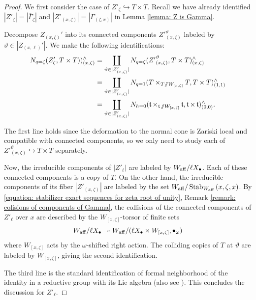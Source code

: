 \begin{proof}
We first consider the case of $Z'_{\zeta} \hookrightarrow T \times T$. Recall we have already identified $|Z'_{\zeta}|=|\overline{\Gamma}_{\zeta}|$ and $|Z'_{(x, \zeta)}| = |\Gamma_{(\zeta, x)}| $  in Lemma \ref{lemma: Z is Gamma}.

Decompose $Z_{(x,\zeta)}'$ into its connected components ${Z'}_{(x, \zeta)}^{\vartheta}$ labeled by $\vartheta \in |Z_{(x, \ell)}'|$. We make the following identifications:
\begin{align*}
  N_{q=\zeta}(Z'_{\zeta}, T \times T))^{\wedge}_{(x, \zeta)}
  &= \coprod_{\vartheta \in |Z'_{(x, \zeta)}|} N_{q=\zeta}({Z'}_{(x, \zeta)}^{\vartheta}, T \times T)^{\wedge}_{(x, \zeta)} \\
  &= \coprod_{\vartheta \in |Z'_{(x, \zeta)}|} N_{q=1}(T \times_{T \sslash W_{[x, \zeta]}} T, T \times T)^{\wedge}_{(1, 1)} \\
  &= \coprod_{\vartheta \in |Z'_{(x, \zeta)}|} N_{h=0}(\operatorname{\mathfrak{t}} \times_{\operatorname{\mathfrak{t}} \sslash W_{[x, \zeta]}} \operatorname{\mathfrak{t}}, \operatorname{\mathfrak{t}} \times \operatorname{\mathfrak{t}})^{\wedge}_{(0, 0)}.
\end{align*}

The first line holds since the deformation to the normal cone is Zariski local and compatible with connected components, so we only need to study each of ${Z'}^{\vartheta}_{(x, \zeta)} \hookrightarrow T \times T$ separately. 

Now, the irreducible components of $|Z'_{\ell}|$ are labeled by $W_{\mathrm{aff}} / \ell X_{\bullet}$. Each of these connected components is a copy of $T$. On the other hand, the irreducible components of its fiber $|Z'_{(x, \zeta)}|$ are labeled by the set $W_{\mathrm{aff}} / \operatorname{Stab}_{W_{\mathrm{aff}}}{(x, \zeta, x)}$. By \eqref{equation: stabilizer exact sequences for zeta root of unity}, Remark \ref{remark: colisions of components of Gamma}, the collisions of the connected components of $Z'_{\ell}$ over $x$ are described by the $W_{[x, \zeta]}$-torsor of finite sets
\begin{equation*}
  W_{\mathrm{aff}} / \ell X_{\bullet} \twoheadrightarrow W_{\mathrm{aff}} / (\ell X_{\bullet} \rtimes W_{[x, \zeta]}, \bullet_{\omega}  )
\end{equation*}
where $W_{[x, \zeta]}$ acts by the $\omega$-shifted right action.
The colliding copies of $T$ at $\vartheta$ are labeled by $W_{[x, \zeta]}$, giving the second identification.

The third line is the standard identification of formal neighborhood of the identity in a reductive group with its Lie algebra (also see \cite[(2.17)]{BBSV22}). This concludes the discussion for $Z'_{\ell}$.



\end{proof}
